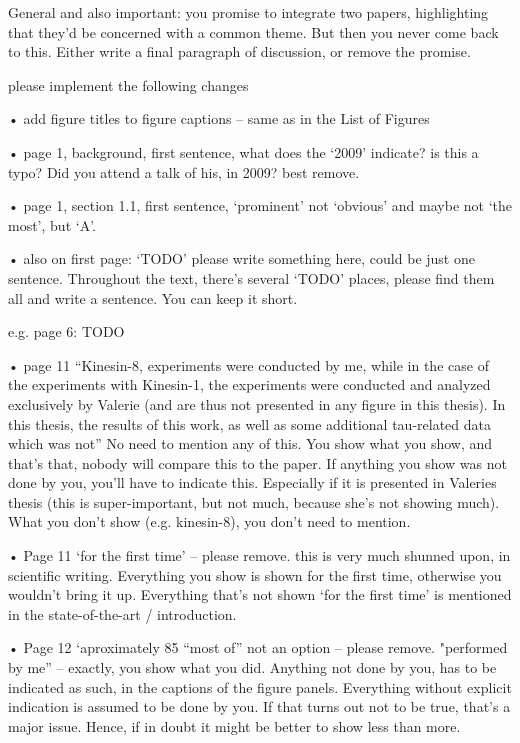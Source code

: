 General and also important: you promise to integrate two papers, highlighting that they’d be concerned with a common theme. But then you never come back to this. Either write a final paragraph of discussion, or remove the promise. 


please implement the following changes


• add figure titles to figure captions – same as in the List of Figures

• page 1, background, first sentence, what does the ‘2009’ indicate? is this a typo? Did you attend a talk of his, in 2009? best remove.

• page 1, section 1.1, first sentence, ‘prominent’ not ‘obvious’ and maybe not ‘the most’, but ‘A’.

• also on first page: ‘TODO’ please write something here, could be just one sentence. Throughout the text, there’s several ‘TODO’ places, please find them all and write a sentence. You can keep it short. 

e.g. page 6: TODO

• page 11 “Kinesin-8, experiments were conducted by me, while in the case of the experiments with Kinesin-1, the experiments were conducted and analyzed exclusively by Valerie (and are thus not presented in any figure in this thesis). In this thesis, the results of this work, as well as some additional tau-related data which was not” 
	No need to mention any of this. You show what you show, and that’s that, nobody will compare this to the paper.  If anything you show was not done by you, you’ll have to indicate this. Especially if it is presented in Valeries thesis (this is super-important, but not much, because she’s not showing much). What you don’t show (e.g. kinesin-8), you don’t need to mention.

• Page 11 ‘for the first time’ – please remove. this is very much shunned upon, in scientific writing. Everything you show is shown for the first time, otherwise you wouldn’t bring it up. Everything that’s not shown ‘for the first time’ is mentioned in the state-of-the-art / introduction.

• Page 12 ‘aproximately 85%
	“most of” not an option – please remove. "performed by me” – exactly, you show what you did. Anything not done by you, has to be indicated as such, in the captions of the figure panels. Everything without explicit indication is assumed to be done by you. If that turns out not to be true, that’s a major issue. Hence, if in doubt it might be better to show less than more. 

